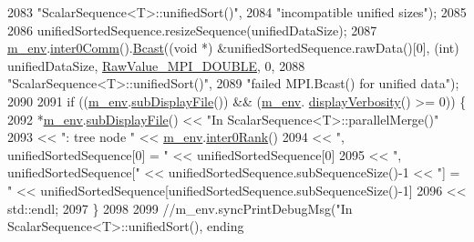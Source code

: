\begin{DoxyCode}
2083                           \textcolor{stringliteral}{"ScalarSequence<T>::unifiedSort()"},
2084                           \textcolor{stringliteral}{"incompatible unified sizes"});
2085 
2086       unifiedSortedSequence.resizeSequence(unifiedDataSize);
2087       \hyperlink{class_q_u_e_s_o_1_1_scalar_sequence_a71618cd6351b29361b437af68447a4c8}{m\_env}.\hyperlink{class_q_u_e_s_o_1_1_base_environment_a689e4d140c74d495d97eb498714a4b82}{inter0Comm}().\hyperlink{class_q_u_e_s_o_1_1_mpi_comm_abd6af8db8b0c7fd2f5b62e26477a9537}{Bcast}((\textcolor{keywordtype}{void} *) &unifiedSortedSequence.rawData()[0], (int) 
      unifiedDataSize, \hyperlink{_mpi_comm_8h_ad0f503bd9fecfe4e570ca3d15aaf2518}{RawValue\_MPI\_DOUBLE}, 0,
2088                                \textcolor{stringliteral}{"ScalarSequence<T>::unifiedSort()"},
2089                                \textcolor{stringliteral}{"failed MPI.Bcast() for unified data"});
2090 
2091       \textcolor{keywordflow}{if} ((\hyperlink{class_q_u_e_s_o_1_1_scalar_sequence_a71618cd6351b29361b437af68447a4c8}{m\_env}.\hyperlink{class_q_u_e_s_o_1_1_base_environment_a8a0064746ae8dddfece4229b9ad374d6}{subDisplayFile}()) && (\hyperlink{class_q_u_e_s_o_1_1_scalar_sequence_a71618cd6351b29361b437af68447a4c8}{m\_env}.
      \hyperlink{class_q_u_e_s_o_1_1_base_environment_a1fe5f244fc0316a0ab3e37463f108b96}{displayVerbosity}() >= 0)) \{
2092         *\hyperlink{class_q_u_e_s_o_1_1_scalar_sequence_a71618cd6351b29361b437af68447a4c8}{m\_env}.\hyperlink{class_q_u_e_s_o_1_1_base_environment_a8a0064746ae8dddfece4229b9ad374d6}{subDisplayFile}() << \textcolor{stringliteral}{"In ScalarSequence<T>::parallelMerge()"}
2093                                 << \textcolor{stringliteral}{": tree node "}                                                          
                << \hyperlink{class_q_u_e_s_o_1_1_scalar_sequence_a71618cd6351b29361b437af68447a4c8}{m\_env}.\hyperlink{class_q_u_e_s_o_1_1_base_environment_ae106b5bb8a80b655b88b3a26b1e7c185}{inter0Rank}()
2094                                 << \textcolor{stringliteral}{", unifiedSortedSequence[0] = "}                                         
                << unifiedSortedSequence[0]
2095                                 << \textcolor{stringliteral}{", unifiedSortedSequence["} << unifiedSortedSequence.subSequenceSize()-1 
      << \textcolor{stringliteral}{"] = "} << unifiedSortedSequence[unifiedSortedSequence.subSequenceSize()-1]
2096                                 << std::endl;
2097       \}
2098 
2099       \textcolor{comment}{//m\_env.syncPrintDebugMsg("In ScalarSequence<T>::unifiedSort(), ending
}
\end{DoxyCode}
